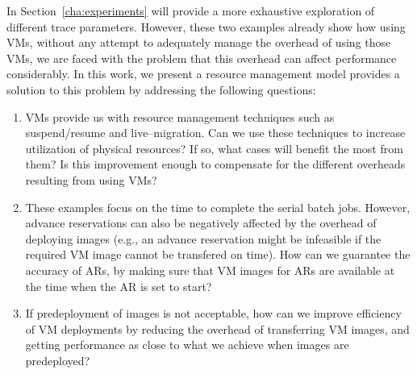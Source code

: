In Section~\ref{cha:experiments} will provide a more exhaustive exploration of different trace parameters. However, these two examples already show how using VMs, without any attempt to adequately manage the overhead of using those VMs, we are faced with the problem that this overhead can affect performance considerably. In this work, we present a resource management model provides a solution to this problem by addressing the following questions:

\begin{enumerate}
\item VMs provide us with resource management techniques such as suspend/resume and live--migration. Can we use these techniques to increase utilization of physical resources? If so, what cases will benefit the most from them? Is this improvement enough to compensate for the different overheads resulting from using VMs?
\item These examples focus on the time to complete the serial batch jobs. However, advance reservations can also be negatively affected by the overhead of deploying images (e.g., an advance reservation might be infeasible if the required VM image cannot be transfered on time). How can we guarantee the accuracy of ARs, by  making sure that VM images for ARs are available at the time when the AR is set to start?
\item If predeployment of images is not acceptable, how can we improve efficiency of VM deployments by reducing the overhead of transferring VM images, and getting performance as close to what we achieve when images are predeployed?
\end{enumerate}
